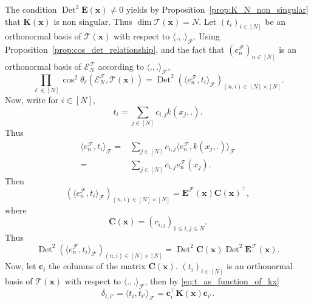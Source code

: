 \documentclass[twoside,11pt]{book}
\numberwithin{theorem}{chapter}
\numberwithin{definition}{chapter}
\numberwithin{proposition}{chapter}
\numberwithin{corollary}{chapter}
\numberwithin{example}{chapter}
\numberwithin{lemma}{chapter}
\numberwithin{assumption}{chapter}
\numberwithin{equation}{chapter}
\numberwithin{figure}{chapter}
\DeclareMathOperator{\Det}{Det}
\DeclareMathOperator{\Tran}{\intercal}
\begin{document}
The condition $\Det^{2} \bm{E}(\bm{x}) \neq 0$ yields by Proposition~\ref{prop:K_N_non_singular} that $\bm{K}(\bm{x})$ is non singular. Thus $\dim \mathcal{T}(\bm{x}) = N$. Let $(t_{i})_{i \in [N]}$ be an orthonormal basis of $\mathcal{T}(\bm{x})$ with respect to $\langle ., . \rangle_{\mathcal{F}}$.
%
Using Proposition~\ref{prop:cos_det_relationship}, and the fact that $(e_{n}^{\mathcal{F}})_{n \in [N]}$ is an orthonormal basis of $\mathcal{E}^{\mathcal{F}}_{N}$ according to $\langle ., . \rangle_{\mathcal{F}}$,
\begin{equation}\label{eq:prod_cos_det_E}
\prod\limits_{\ell \in [N]} \cos^{2} \theta_{\ell} \left(\mathcal{E}^{\mathcal{F}}_{N}, \mathcal{T}(\bm{x}) \right) = \Det^{2} (\langle e_{n}^{\mathcal{F}}, t_{i} \rangle_{\mathcal{F}})_{(n,i) \in [N]\times[N]}.
\end{equation}
Now, write for $i \in [N]$,
\begin{equation}\label{eq:t_as_function_of_kx}
t_{i} = \sum\limits_{j \in [N]} c_{i,j} k(x_{j},.).
\end{equation}
%
Thus
\begin{align}
\langle e_{n}^{\mathcal{F}}, t_{i} \rangle_{\mathcal{F}} = & \sum\limits_{j \in [N]} c_{i,j} \langle e_{n}^{\mathcal{F}}, k(x_{j},.) \rangle_{\mathcal{F}} \\
= &\sum\limits_{j \in [N]} c_{i,j}  e_{n}^{\mathcal{F}}(x_{j}).
\end{align}
%
Then
\begin{equation}
(\langle e_{n}^{\mathcal{F}}, t_{i} \rangle_{\mathcal{F}})_{(n,i) \in [N]\times[N]} = \bm{E}^{\mathcal{F}}(\bm{x}) \bm{C}(\bm{x})^{\Tran} ,
\end{equation}
where
\begin{equation}
\bm{C}(\bm{x}) = (c_{i,j})_{1 \leq i,j \leq N}.
\end{equation}
%
Thus
\begin{equation}\label{eq:AN_times_EN}
\Det^{2} (\langle e_{n}^{\mathcal{F}}, t_{i} \rangle_{\mathcal{F}})_{(n,i) \in [N]\times[N]} = \Det^{2} \bm{C}(\bm{x}) \Det^{2} \bm{E}^{\mathcal{F}}(\bm{x}).
\end{equation}
Now, let $\bm{c}_{i}$ the columns of the matrix $\bm{C}(\bm{x})$. $(t_{i})_{i \in [N]}$ is an orthonormal basis of $\mathcal{T}(\bm{x})$ with respect to $\langle .,. \rangle_{\mathcal{F}}$, then by \eqref{eq:t_as_function_of_kx}
\begin{equation}
  \delta_{i,i'} = \langle t_{i}, t_{i'} \rangle_{\mathcal{F}} = \bm{c}_{i}^{\Tran} \bm{K}(\bm{x}) \bm{c}_{i'}  .
\end{equation}
\end{document}
